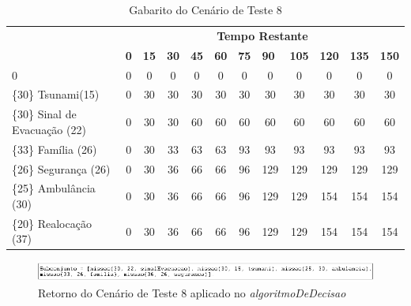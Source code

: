 \begin{table}[!h]
\centering
\caption{Gabarito do Cenário de Teste 8}
\label{gabarito8}
\begin{tabular}{lccccccccccc}
\multicolumn{1}{c}{\cellcolor[HTML]{00D2CB}} & \multicolumn{11}{c}{\cellcolor[HTML]{00D2CB}\textbf{Tempo Restante}} \\ 
\multicolumn{1}{c}{\cellcolor[HTML]{00D2CB}{\color[HTML]{333333} \textbf{\{Valor\} Missão(Tempo)}}} & 
\multicolumn{1}{l}{\cellcolor[HTML]{C0F2F0}\textbf{0}} & 
\multicolumn{1}{l}{\cellcolor[HTML]{C0F2F0}\textbf{15}} & 
\multicolumn{1}{l}{\cellcolor[HTML]{C0F2F0}\textbf{30}} & 
\multicolumn{1}{l}{\cellcolor[HTML]{C0F2F0}\textbf{45}} & 
\multicolumn{1}{l}{\cellcolor[HTML]{C0F2F0}\textbf{60}} & 
\multicolumn{1}{l}{\cellcolor[HTML]{C0F2F0}\textbf{75}} & 
\multicolumn{1}{l}{\cellcolor[HTML]{C0F2F0}\textbf{90}} & 
\multicolumn{1}{l}{\cellcolor[HTML]{C0F2F0}\textbf{105}} & 
\multicolumn{1}{l}{\cellcolor[HTML]{C0F2F0}\textbf{120}} & 
\multicolumn{1}{l}{\cellcolor[HTML]{C0F2F0}\textbf{135}} & 
\multicolumn{1}{l}{\cellcolor[HTML]{C0F2F0}\textbf{150}} \\ 
0 & 0 & 0 & 0 & 0 & 0 & 0 & 0 & 0 & 0 & 0 & 0  \\ 
\{30\}  Tsunami(15) & 0 & 30 & 30 & 30 & 30 & 30 & 30 & 30 & 30 & 30 & 30 \\  
\{30\}  Sinal de Evacuação (22) &  0 & 30 & 30 & 60 & 60 & 60 & 60 & 60 & 60 & 60 & 60 \\ 
\{33\}  Família (26) & 0 & 30 & 33 & 63 & 63 & 93 & 93 & 93 & 93 & 93 & 93  \\ 
\{26\}  Segurança (26) & 0 & 30 & 36 & 66 & 66 & 96 & 129 & 129 & 129 & 129 & 129 \\ 
\{25\}  Ambulância (30) & 0 & 30 & 36 & 66 & 66 & 96 & 129 & 129 & 154 & 154 & 154 \\ 
{\color[HTML]{FE0000} \{20\}  Realocação (37)} & 0 & 30 & 36 & 66 & 66 & 96 & 129 & 129 & 154 & 154 & 154 \\ 
\end{tabular}
\end{table}


\FloatBarrier
\begin{figure}[!h]
\centering
\includegraphics[keepaspectratio=true,scale=0.7]{figuras/resultado8.png}
\caption{Retorno do Cenário de Teste 8 aplicado no \textit{algoritmoDeDecisao}}
\label{resultado8}
\end{figure}

